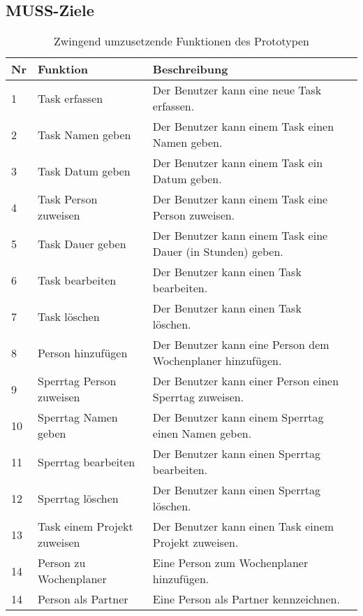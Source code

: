 \subsection{MUSS-Ziele}
\begin{table}[!ht]
\begin{center}
    \begin{tabular}{llp{8cm}l}
        \toprule Nr & Funktion & Beschreibung \\
        \midrule 1 & Task erfassen & Der Benutzer kann eine neue Task erfassen. \\
        \midrule 2 & Task Namen geben & Der Benutzer kann einem Task einen Namen geben. \\
        \midrule 3 & Task Datum geben & Der Benutzer kann einem Task ein Datum geben. \\
        \midrule 4 & Task Person zuweisen & Der Benutzer kann einem Task eine Person zuweisen. \\
        \midrule 5 & Task Dauer geben & Der Benutzer kann einem Task eine Dauer (in Stunden) geben. \\
        \midrule 6 & Task bearbeiten & Der Benutzer kann einen Task bearbeiten. \\ 
        \midrule 7 & Task löschen & Der Benutzer kann einen Task löschen. \\
        \midrule 8 & Person hinzufügen & Der Benutzer kann eine Person dem Wochenplaner hinzufügen. \\
        \midrule 9 & Sperrtag Person zuweisen & Der Benutzer kann einer Person einen Sperrtag zuweisen. \\
        \midrule 10 & Sperrtag Namen geben & Der Benutzer kann einem Sperrtag einen Namen geben. \\
        \midrule 11 & Sperrtag bearbeiten & Der Benutzer kann einen Sperrtag bearbeiten.\\
        \midrule 12 & Sperrtag löschen & Der Benutzer kann einen Sperrtag löschen.\\
        \midrule 13 & Task einem Projekt zuweisen & Der Benutzer kann einen Task einem Projekt zuweisen.\\
        \midrule 14 & Person zu Wochenplaner & Eine Person zum Wochenplaner hinzufügen.\\
        \midrule 14 & Person als Partner & Eine Person als Partner kennzeichnen.\\
        \bottomrule
    \end{tabular}
    \caption{Zwingend umzusetzende Funktionen des Prototypen}
    \label{tab:muss_funktionen}
\end{center}
\end{table}
